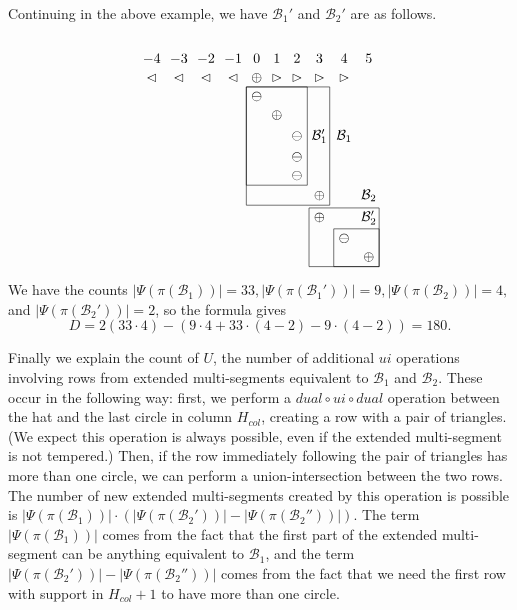 \documentclass[11pt,letterpaper]{amsart}
\newcommand{\BB}{\mathcal{B}}
\numberwithin{equation}{section}
\begin{document}
Continuing in the above example, we have $\BB_1'$ and $\BB_2'$ are as follows.
\[\begin{tikzpicture}[baseline=(current bounding box.north)]
  \matrix (m)[matrix of math nodes, nodes in empty cells] {
    -4 & -3 & -2 & -1 & 0 & 1 & 2 & 3 & 4 & 5 \\
    \lhd & \lhd & \lhd & \lhd & \oplus & \rhd & \rhd & \rhd & \rhd & \\
    & & & & \ominus & & & & & \\
    & & & & & \oplus & & & & \\
    & & & & & & \ominus & \BB_1' & \BB_1 & \\
    & & & & & & \ominus & & & \\
    & & & & & & \ominus & & & \\
    & & & & & & & \oplus & & \BB_2 \\
    & & & & & & & \oplus & & \BB_2' \\
    & & & & & & & & \ominus & \\
    & & & & & & & & & \oplus \\
  } ;
  \draw (m-3-5.north west) rectangle (m-8-8.south east);
  \draw (m-3-5.north west) rectangle (m-7-7.south east);
  \draw (m-9-8.north west) rectangle (m-11-10.south east);
  \draw (m-10-9.north west) rectangle (m-11-10.south east);
\end{tikzpicture}\] We have the counts $|\Psi(\pi(\BB_1))| = 33, |\Psi(\pi(\BB_1'))| = 9, |\Psi(\pi(\BB_2))| = 4,$ and $|\Psi(\pi(\BB_2'))| = 2$, so the formula gives \[D = 2 (33 \cdot 4) - (9 \cdot 4 + 33 \cdot (4 - 2) - 9 \cdot (4 - 2)) = 180.\]

Finally we explain the count of $U$, the number of additional $ui$ operations involving rows from extended multi-segments equivalent to $\BB_1$ and $\BB_2$. These occur in the following way: first, we perform a $dual \circ ui \circ dual$ operation between the hat and the last circle in column $H_{col}$, creating a row with a pair of triangles. (We expect this operation is always possible, even if the extended multi-segment is not tempered.) Then, if the row immediately following the pair of triangles has more than one circle, we can perform a union-intersection between the two rows. The number of new extended multi-segments created by this operation is possible is $|\Psi(\pi(\BB_1))| \cdot (|\Psi(\pi(\BB_2'))| - |\Psi(\pi(\BB_2''))|)$. The term $|\Psi(\pi(\BB_1))|$ comes from the fact that the first part of the extended multi-segment can be anything equivalent to $\BB_1$, and the term $|\Psi(\pi(\BB_2'))| - |\Psi(\pi(\BB_2''))|$ comes from the fact that we need the first row with support in $H_{col}+1$ to have more than one circle.
\end{document}
